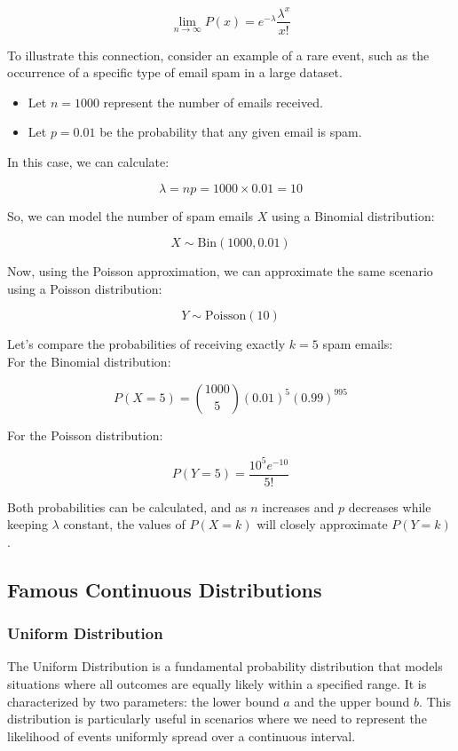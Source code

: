 \[
\lim_{n \to \infty} P(x) = e^{-\lambda} \frac{\lambda^x}{x!}
\]

\begin{example}
    To illustrate this connection, consider an example of a rare event, such as the occurrence of a specific type of email spam in a large dataset.

\begin{itemize}
    \item Let \( n = 1000 \) represent the number of emails received.
    \item Let \( p = 0.01 \) be the probability that any given email is spam.
\end{itemize}

In this case, we can calculate:

\[
\lambda = n p = 1000 \times 0.01 = 10
\]

So, we can model the number of spam emails \( X \) using a Binomial distribution:

\[
X \sim \text{Bin}(1000, 0.01)
\]

Now, using the Poisson approximation, we can approximate the same scenario using a Poisson distribution:

\[
Y \sim \text{Poisson}(10)
\]

Let’s compare the probabilities of receiving exactly \( k = 5 \) spam emails:\\

For the Binomial distribution:

\[
P(X = 5) = \binom{1000}{5} (0.01)^5 (0.99)^{995}
\]

For the Poisson distribution:

\[
P(Y = 5) = \frac{10^5 e^{-10}}{5!}
\]

Both probabilities can be calculated, and as \( n \) increases and \( p \) decreases while keeping \( \lambda \) constant, the values of \( P(X = k) \) will closely approximate \( P(Y = k) \).
\end{example}

\subsection{Famous Continuous Distributions}

\subsubsection{Uniform Distribution}

The Uniform Distribution is a fundamental probability distribution that models situations where all outcomes are equally likely within a specified range. It is characterized by two parameters: the lower bound \( a \) and the upper bound \( b \). This distribution is particularly useful in scenarios where we need to represent the likelihood of events uniformly spread over a continuous interval.\\

